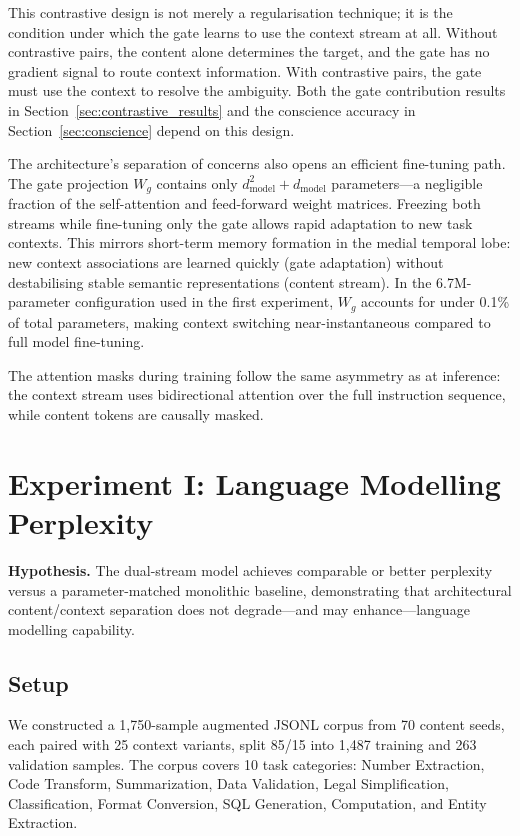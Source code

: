 \documentclass[11pt,a4paper]{article}
\theoremstyle{definition}
\begin{document}
This contrastive design is not merely a regularisation technique; it is the condition under which the gate learns to use the context stream at all. Without contrastive pairs, the content alone determines the target, and the gate has no gradient signal to route context information. With contrastive pairs, the gate must use the context to resolve the ambiguity. Both the gate contribution results in Section~\ref{sec:contrastive_results} and the conscience accuracy in Section~\ref{sec:conscience} depend on this design.

The architecture's separation of concerns also opens an efficient fine-tuning path. The gate projection $W_g$ contains only $d_\text{model}^2 + d_\text{model}$ parameters---a negligible fraction of the self-attention and feed-forward weight matrices. Freezing both streams while fine-tuning only the gate allows rapid adaptation to new task contexts. This mirrors short-term memory formation in the medial temporal lobe: new context associations are learned quickly (gate adaptation) without destabilising stable semantic representations (content stream). In the 6.7M-parameter configuration used in the first experiment, $W_g$ accounts for under 0.1\% of total parameters, making context switching near-instantaneous compared to full model fine-tuning.

The attention masks during training follow the same asymmetry as at inference: the context stream uses bidirectional attention over the full instruction sequence, while content tokens are causally masked.

\section{Experiment I: Language Modelling Perplexity}

\textbf{Hypothesis.} The dual-stream model achieves comparable or better perplexity versus a parameter-matched monolithic baseline, demonstrating that architectural content/context separation does not degrade---and may enhance---language modelling capability.

\subsection{Setup}

We constructed a 1,750-sample augmented JSONL corpus from 70 content seeds, each paired with 25 context variants, split 85/15 into 1,487 training and 263 validation samples. The corpus covers 10 task categories: Number Extraction, Code Transform, Summarization, Data Validation, Legal Simplification, Classification, Format Conversion, SQL Generation, Computation, and Entity Extraction.
\end{document}
